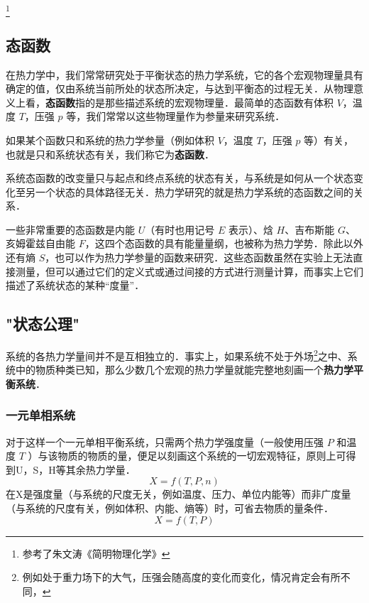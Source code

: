 \footnote{参考了朱文涛《简明物理化学》}

\subsection{态函数}
在热力学中，我们常常研究处于平衡状态的热力学系统，它的各个宏观物理量具有确定的值，仅由系统当前所处的状态所决定，与达到平衡态的过程无关．从物理意义上看，\textbf{态函数}指的是那些描述系统的宏观物理量．最简单的态函数有体积 $V$，温度 $T$，压强 $p$ 等，我们常常以这些物理量作为参量来研究系统．

如果某个函数只和系统的热力学参量（例如体积 $V$，温度 $T$，压强 $p$ 等）有关，也就是只和系统状态有关，我们称它为\textbf{态函数}．

系统态函数的改变量只与起点和终点系统的状态有关，与系统是如何从一个状态变化至另一个状态的具体路径无关．热力学研究的就是热力学系统的态函数之间的关系．

一些非常重要的态函数是内能 $U$（有时也用记号 $E$ 表示）、焓 $H$、吉布斯能 $G$、亥姆霍兹自由能 $F$，这四个态函数的具有能量量纲，也被称为热力学势．除此以外还有熵 $S$，也可以作为热力学参量的函数来研究．这些态函数虽然在实验上无法直接测量，但可以通过它们的定义式或通过间接的方式进行测量计算，而事实上它们描述了系统状态的某种“度量”．

\subsection{"状态公理"}
系统的各热力学量间并不是互相独立的．事实上，如果系统不处于外场\footnote{例如处于重力场下的大气，压强会随高度的变化而变化，情况肯定会有所不同，}之中、系统中的物质种类已知，那么少数几个宏观的热力学量就能完整地刻画一个\textbf{热力学平衡系统}．

\subsubsection{一元单相系统}
对于这样一个一元单相平衡系统，只需两个热力学强度量（一般使用压强 $P$ 和温度 $T$ ）与该物质的物质的量，便足以刻画这个系统的一切宏观特征，原则上可得到U，S，H等其余热力学量．
\begin{equation}
X=f(T,P,n)
\end{equation}
在X是强度量（与系统的尺度无关，例如温度、压力、单位内能等）而非广度量（与系统的尺度有关，例如体积、内能、熵等）时，可省去物质的量条件．
\begin{equation}
X=f(T,P)
\end{equation}

